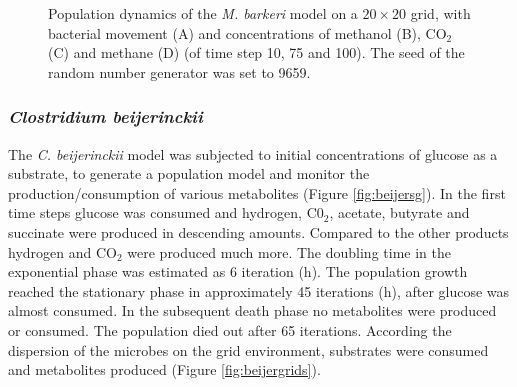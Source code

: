 \begin{figure}[h!]
{\begin{minipage}[t]{0.3\textwidth}
  \end{minipage}
  }
  \caption{Population dynamics of the \emph{M. barkeri} model on a $20\times20$ grid, with bacterial movement (A) and concentrations of methanol (B), CO$_2$ (C) and methane (D) (of time step 10, 75 and 100). The seed of the random number generator was set to 9659.}
  \label{fig:barkerigrids}
\end{figure}


\subsubsection{\textit{Clostridium beijerinckii}}
The \textit{C. beijerinckii} model was subjected to initial concentrations of glucose as a substrate, to generate a population model and monitor the production/consumption of various metabolites (Figure \hyperref[fig:beijersg]{\ref{fig:beijersg}}). In the first time steps glucose was consumed and hydrogen, C0$_2$, acetate, butyrate and succinate were produced in descending amounts. 
Compared to the other products hydrogen and CO$_2$ were produced much more.
The doubling time in the exponential phase was estimated as 6 iteration (h).
The population growth reached the stationary phase in approximately 45 iterations (h), after glucose was almost consumed. In the subsequent death phase no metabolites were produced or consumed. The population died out after 65 iterations.
According the dispersion of the microbes on the grid environment, substrates were consumed and metabolites produced (Figure \hyperref[fig:beijergrids]{\ref{fig:beijergrids}}).
